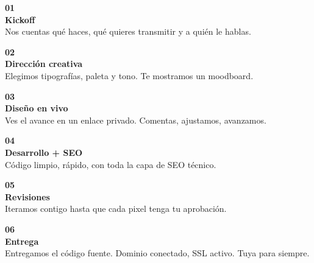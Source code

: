 \documentclass[11pt, a4paper]{article}
\begin{document}
  \noindent
  \begin{minipage}[t]{0.15\textwidth}
    \begin{center}
      \textbf{\color{mainblue}
      01} \\[2mm] {\small\bfseries Kickoff} \\[1mm]
      {\footnotesize\color{basicgray}Nos cuentas qué haces, qué quieres transmitir y a quién le hablas.}
    \end{center}
  \end{minipage}
  \hfill
  \begin{minipage}[t]{0.15\textwidth}
    \begin{center}
      \textbf{\color{mainblue}
      02} \\[2mm] {\small\bfseries Dirección creativa} \\[1mm]
      {\footnotesize\color{basicgray}Elegimos tipografías, paleta y tono. Te mostramos un moodboard.}
    \end{center}
  \end{minipage}
  \hfill
  \begin{minipage}[t]{0.15\textwidth}
    \begin{center}
      \textbf{\color{mainblue}
      03} \\[2mm] {\small\bfseries Diseño en vivo} \\[1mm]
      {\footnotesize\color{basicgray}Ves el avance en un enlace privado. Comentas, ajustamos, avanzamos.}
    \end{center}
  \end{minipage}
  \hfill
  \begin{minipage}[t]{0.15\textwidth}
    \begin{center}
      \textbf{\color{mainblue}
      04} \\[2mm] {\small\bfseries Desarrollo + SEO} \\[1mm]
      {\footnotesize\color{basicgray}Código limpio, rápido, con toda la capa de SEO técnico.}
    \end{center}
  \end{minipage}
  \hfill
  \begin{minipage}[t]{0.15\textwidth}
    \begin{center}
      \textbf{\color{mainblue}
      05} \\[2mm] {\small\bfseries Revisiones} \\[1mm]
      {\footnotesize\color{basicgray}Iteramos contigo hasta que cada pixel tenga tu aprobación.}
    \end{center}
  \end{minipage}
  \hfill
  \begin{minipage}[t]{0.15\textwidth}
    \begin{center}
      \textbf{\color{mainblue}
      06} \\[2mm] {\small\bfseries Entrega} \\[1mm]
      {\footnotesize\color{basicgray}Entregamos el código fuente. Dominio conectado, SSL activo. Tuya para siempre.}
    \end{center}
  \end{minipage}
\end{document}
